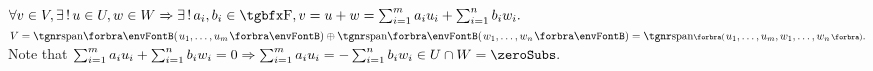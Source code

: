 
$\forall v\in V,\exists\,!\,u\in U,w\in W\Rightarrow\exists\,!\,a_i,b_i\in\Fbb,v=u+w=\sum_{i=1}^ma_iu_i+\sum_{i=1}^nb_iw_i.$\parSol{}
\Or\;$V=\Span{u_1,\dots,u_m}\oplus\Span{w_1,\dots,w_n}=\Span[\BigPar]{u_1,\dots,u_m,w_1,\dots,w_n}.$\parSol{\vspace{2pt}}
\Blind{\Or\;}Note that $\sum_{i=1}^ma_iu_i+\sum_{i=1}^nb_iw_i=0\Rightarrow\sum_{i=1}^ma_iu_i=-\sum_{i=1}^nb_iw_i\in U\cap W=\zeroSubs.$\PfEnd
\SepLine


